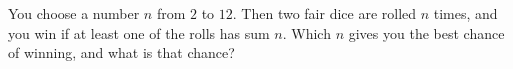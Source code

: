 You choose a number $n$ from $2$ to $12$. Then two fair dice are rolled $n$ times, and you win if at least one of the rolls has sum $n$. Which $n$ gives you the best chance of winning, and what is that chance?
